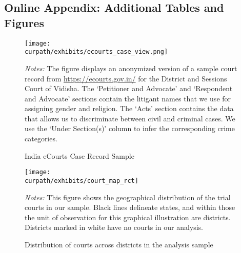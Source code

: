 \documentclass[12pt,english]{article}
\newcommand{\HOME}{\string~}
\newcommand{\curpath}{\HOME/ddl/justice-overleaf}
\newcommand{\curpath}{.}
\begin{document}
 
\begin{appendices}

\setcounter{figure}{0} 
\renewcommand{\thefigure}{A\arabic{figure}} 
\setcounter{table}{0} \renewcommand{\thetable}{A\arabic{table}} 


\section{Online Appendix: Additional Tables and Figures}

\begin{figure}[htp!]
 \centering
 \caption{India eCourts Case Record Sample}
 \texttt{[image: \\curpath/exhibits/ecourts\_case\_view.png]}
 \label{fig:ecourts_case_view}
 \begin{minipage}{1.0\textwidth}
    {\scriptsize \emph{Notes:} The figure displays an anonymized version of a sample court record from \url{https://ecourts.gov.in/} for the District and Sessions Court of Vidisha. The `Petitioner and Advocate' and `Respondent and Advocate' sections contain the litigant names that we use for assigning gender and religion. The `Acts' section contains the data that allows us to discriminate between civil and criminal cases. We use the `Under Section(s)' column to infer the corresponding crime categories.\par}
 \end{minipage}
\end{figure}



\begin{figure}
    \centering
    \caption{Distribution of courts across districts in the analysis sample}
    \texttt{[image: \\curpath/exhibits/court\_map\_rct]} 
    \label{fig:court_maps}
     \begin{minipage}{1.0\textwidth}
    {\scriptsize \emph{Notes:} This figure shows the geographical distribution of the trial courts in our sample. Black lines delineate states, and within those the unit of observation for this graphical illustration are districts. Districts marked in white have no courts in our analysis.\par}
 \end{minipage}
\end{figure}



\end{appendices}
\end{document}
